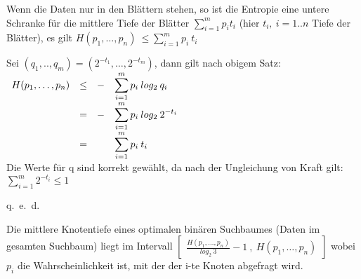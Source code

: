 \begin{satz}
 Wenn die Daten nur in den Blättern stehen, so ist die Entropie eine untere Schranke für die mittlere Tiefe
 der Blätter $\sum_{i=1}^m p_i t_i$ (hier $t_i,\:i=1..n$ Tiefe der Blätter), es gilt
 $H(p_1,\ldots,p_n)\:\leq\sum_{i=1}^m p_i\:t_i$
\end{satz}
\begin{beweis}
Sei $(q_1,..,q_m)=(2^{-t_1},\ldots,2^{-t_m})$, dann gilt nach obigem Satz:\\
$\begin{array}{cccl}
  H(p_1,\ldots,p_n) & \leq & - &\displaystyle\sum_{i=1}^m p_i\:log_2\:q_i \vspace{0.3mm}\\
                 & =    & - &\displaystyle\sum_{i=1}^m p_i\:log_2\:2^{-t_i} \vspace{0.3mm}\\
                 & =    &   &\displaystyle\sum_{i=1}^m p_i\:t_i \\
\end{array}$\\
Die Werte für q sind korrekt gewählt, da nach der Ungleichung von Kraft gilt: $\sum_{i=1}^m 2^{-t_i}\leq1$
\end{beweis}
\begin{flushright} q.~e.~d. \end{flushright}
\begin{satz}
Die mittlere Knotentiefe eines optimalen binären Suchbaumes (Daten im gesamten Suchbaum) liegt im Intervall $
\begin{bmatrix}
  \displaystyle\frac{ H(p_1,\ldots,p_n)}{log_2\:3}-1\:,\:H(p_1,\ldots,p_n)
\end{bmatrix}$
wobei $p_i$ die Wahrscheinlichkeit ist, mit der der i-te Knoten abgefragt wird.
\end{satz}

